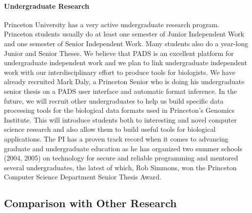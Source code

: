 \documentclass[11pt]{article}
\begin{document}

\paragraph*{Undergraduate Research}
Princeton University has a very active undergraduate research program.
Princeton students usually do at least one semester of
Junior Independent Work and one semester of Senior Independent Work. 
Many students also do a year-long
Junior and Senior Theses.  We believe that PADS is an excellent
platform for undergraduate independent work and we plan to link
undergraduate independent work with our interdisciplinary effort to
produce tools for biologists.  We have already recruited Mark Daly,
a Princeton Senior who is doing his undergraduate senior thesis
on a PADS user interface and automatic format inference.
In the future, we will recruit other undergraduates to help us build
specific data processing tools for the biological data formats
used in Princeton's Genomics Institute.
This will introduce students both to interesting and novel
computer science research and also allow them to build useful
tools for biological applications. The PI has a proven track record
when it comes to advancing graduate and undergraduate education
as he has organized two summer schools (2004, 2005) on technology for
secure and reliable programming and mentored several undergraduates,
the latest of which, Rob Simmons, won the Princeton Computer Science Department
Senior Thesis Award.

\subsection{Comparison with Other Research}
\label{ssec:related}
\end{document}
